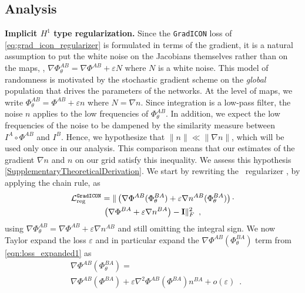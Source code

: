 \subsection{Analysis}
\label{subsection:analysis}
\vspace{-0.15cm}
\noindent
{\bf Implicit $H^1$ type regularization.}
Since the \texttt{GradICON} loss of \ref{eq:grad_icon_regularizer} is formulated in terms of the gradient, it is a natural assumption to put the white noise on the Jacobians themselves rather than on the maps, \ie, $\nabla \Phi^{AB}_\theta = \nabla \Phi^{AB} + \varepsilon N$ where $N$ is a white noise. This model of randomness is motivated by the stochastic gradient scheme on the \emph{global} population that drives the parameters of the networks. At the level of maps, we write $ \Phi^{AB}_\theta =  \Phi^{AB} + \varepsilon n$ where $N = \nabla n$. Since integration is a low-pass filter, the noise $n$ applies to the low frequencies of $\Phi_\theta^{AB}$. In addition, we expect the low frequencies of the noise to be dampened by the similarity measure between $I^A \circ \Phi^{AB}$ and $I^B$.
Hence, we hypothesize that $\| n \| \ll \| \nabla n \|$, which will be used only once in our analysis. This comparison means that our estimates of the gradient $\nabla n$ and $n$ on our grid satisfy this inequality. We assess this hypothesis \ref{SupplementaryTheoreticalDerivation}.
We start by rewriting the \gradicon~regularizer %
, by applying the chain rule, as
\begin{multline}
	\mathcal{L}_{\text{reg}}^{\texttt{GradICON}} =    \|\left(\nabla \Phi^{AB}(\Phi^{BA}_\theta) + \varepsilon \nabla n^{AB}( \Phi^{BA}_{\theta}) \right) \cdot \\ \left(\nabla \Phi^{BA} + \varepsilon \nabla n^{BA}\right)  - \mathbf{I}\|_F^2\enspace,
	\label{eqn:loss_expanded1}
\end{multline}
using $\nabla \Phi^{AB}_\theta = \nabla \Phi^{AB} + \varepsilon \nabla n^{AB}$
and still omitting the integral sign. We now Taylor expand the loss \wrt $\varepsilon$ and in particular expand the $\nabla \Phi^{AB}(\Phi^{BA}_\theta)$ term from \ref{eqn:loss_expanded1} as
\begin{equation}
	\begin{split}
		& \nabla \Phi^{AB}(\Phi^{BA}_\theta) = \\
		& \nabla \Phi^{AB}(\Phi^{BA}) + \varepsilon \nabla^2 \Phi^{AB}(\Phi^{BA}) n^{BA} + o(\varepsilon)\enspace.
	\end{split}
	\label{eqn:expansion2}
\end{equation}
